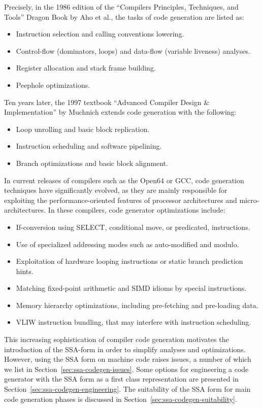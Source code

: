Precisely, in the 1986 edition of
the ``Compilers Principles, Techniques, and Tools'' Dragon Book by Aho et al.,
the tasks of code generation are listed as:
\begin{itemize}
\item Instruction selection and calling conventions lowering.
\item Control-flow (dominators, loops) and data-flow (variable liveness) analyses.
\item Register allocation and stack frame building.
\item Peephole optimizations.
\end{itemize}
Ten years later, the 1997 textbook ``Advanced Compiler Design \& Implementation''
by Muchnich extends code generation with the following: \begin{itemize}
\item Loop unrolling and basic block replication.
\item Instruction scheduling and software pipelining.
\item Branch optimizations and basic block alignment.
\end{itemize}
In current releases of compilers such as the Open64 or GCC, code generation
techniques have significantly evolved, as they are mainly responsible for
exploiting the performance-oriented features of processor architectures and
micro-architectures. In these compilers, code generator optimizations
include: \begin{itemize}
\item If-conversion using SELECT, conditional move, or predicated, instructions.
\item Use of specialized addressing modes such as auto-modified and modulo.
\item Exploitation of hardware looping instructions or static branch prediction
hints.
\item Matching fixed-point arithmetic and SIMD idioms by special instructions.
\item Memory hierarchy optimizations, including pre-fetching and pre-loading
data.
\item VLIW instruction bundling, that may interfere with instruction
scheduling.
\end{itemize}

This increasing sophistication of compiler code generation motivates the
introduction of the SSA-form in order to simplify analyses and optimizations.
However, using the SSA form on machine code raises issues, a number of
which we list in Section~\ref{sec:ssa-codegen-issues}.  Some options for
engineering a code generator with the SSA form as a first class representation
are presented in Section~\ref{sec:ssa-codegen-engineering}.  The suitability of
the SSA form for main code generation phases is discussed in
Section~\ref{sec:ssa-codegen-suitability}.

